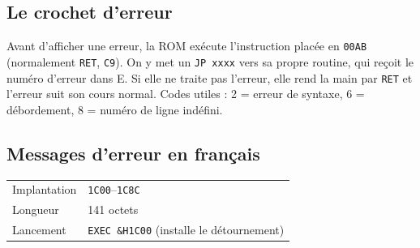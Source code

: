 \documentclass[a4paper,10pt]{article}
\makeatletter
\newcommand{\hex}[1]{\texttt{#1}}
\newcommand{\fiche}[3]{%
  \begin{center}\small
  \begin{tabular}{@{}ll@{}}
  \toprule
  Implantation & #1 \\
  Longueur & #2 \\
  Lancement & #3 \\
  \bottomrule
  \end{tabular}
  \end{center}}
\makeatother
\begin{document}
\subsection{Le crochet d'erreur}
Avant d'afficher une erreur, la ROM exécute l'instruction placée en
\hex{00AB} (normalement \texttt{RET}, \hex{C9}). On y met un
\texttt{JP xxxx} vers sa propre routine, qui reçoit le numéro d'erreur dans
E. Si elle ne traite pas l'erreur, elle rend la main par \texttt{RET} et
l'erreur suit son cours normal. Codes utiles : 2 = erreur de syntaxe,
6 = débordement, 8 = numéro de ligne indéfini.

\subsection{Messages d'erreur en français}
\fiche{\hex{1C00}--\hex{1C8C}}{141 octets}{\texttt{EXEC \&H1C00} (installe le détournement)}
\end{document}
